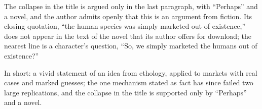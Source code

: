 \begin{afterword}
The collapse in the title is argued only in the last paragraph, with ``Perhaps'' and a novel, and the author admits openly that this is an argument from fiction. Its closing quotation, ``the human species was simply marketed out of existence,'' does not appear in the text of the novel that its author offers for download; the nearest line is a character's question, ``So, we simply marketed the humans out of existence?''

In short: a vivid statement of an idea from ethology, applied to markets with real cases and marked guesses; the one mechanism stated as fact has since failed two large replications, and the collapse in the title is supported only by ``Perhaps'' and a novel.
\end{afterword}
